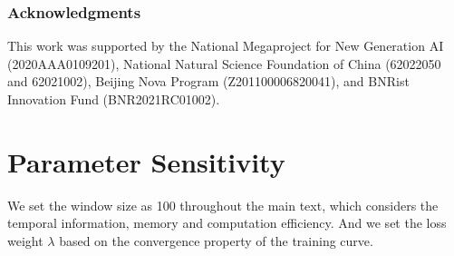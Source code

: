 \documentclass{article} %
\begin{document}

\subsubsection*{Acknowledgments}

This work was supported by the National Megaproject for New Generation AI  (2020AAA0109201), National Natural Science Foundation of China (62022050 and 62021002), Beijing Nova Program (Z201100006820041), and BNRist Innovation Fund (BNR2021RC01002).









\appendix

\newpage

\section{Parameter Sensitivity} \label{sec:appdix_sensitity}

We set the window size as 100 throughout the main text, which considers the temporal information, memory and computation efficiency. And we set the loss weight $\lambda$ based on the convergence property of the training curve. 
\end{document}
